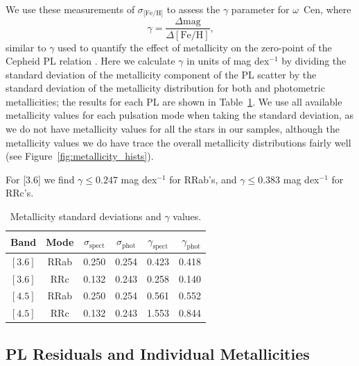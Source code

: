 \documentclass[a4paper,fleqn,usenatbib]{mnras}
\begin{document}
We use these measurements of $\sigma_\text{[Fe/H]}$ to assess the $\gamma$ parameter for $\omega$~Cen, where 
\begin{equation} \label{eqn:gamma}
\gamma = \dfrac {\Delta \text{mag}} {\Delta [\text{Fe/H}]}\text{,}
\end{equation}
similar to $\gamma$ used to quantify the effect of metallicity on the zero-point of the Cepheid PL relation \citep{1998ApJ...498..181K, 2009MNRAS.396.1287S}. Here we calculate $\gamma$ in units of mag dex$^{-1}$ by dividing the standard deviation of the metallicity component of the PL scatter by the standard deviation of the metallicity distribution for both \citep{2006ApJ...640L..43S} and photometric \citep{2000AJ....119.1824R} metallicities; the results for each PL are shown in Table~\ref{tab:gamma}. We use all available metallicity values for each pulsation mode when taking the standard deviation, as we do not have metallicity values for all the stars in our samples, although the metallicity values we do have trace the overall metallicity distributions fairly well (see Figure~\ref{fig:metallicity_hists}).

For [3.6] we find $\gamma \leq 0.247$ mag dex$^{-1}$ for RRab's, and $\gamma \leq 0.383$ mag dex$^{-1}$ for RRc's.

\begin{table}
\centering
\caption{Metallicity standard deviations and $\gamma$ values.}
\label{tab:gamma}
\begin{tabular}{lccccr} 
\hline \hline
Band & Mode & $\sigma_{\text{spect}}$ & $\sigma_{\text{phot}}$ & $\gamma_{\text{spect}}$ & $\gamma_{\text{phot}}$ \\
\hline
$[3.6]$ & RRab & 0.250 & 0.254 & 0.423 & 0.418 \\ %
$[3.6]$ & RRc & 0.132 & 0.243 & 0.258 & 0.140 \\ %
$[4.5]$ & RRab & 0.250 & 0.254 & 0.561 & 0.552 \\ %
$[4.5]$ & RRc & 0.132 & 0.243 & 1.553 & 0.844 \\ %
\hline
\end{tabular}
\end{table}

\subsection{PL Residuals and Individual Metallicities}
\label{sec:residuals}
\end{document}
